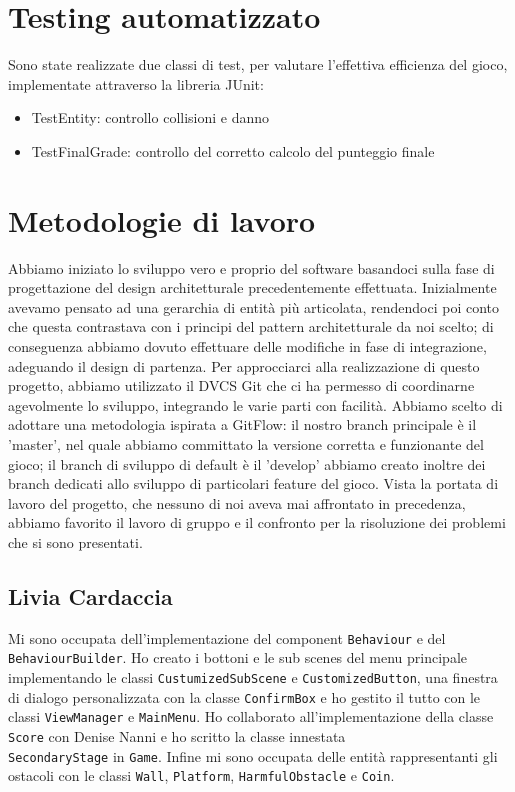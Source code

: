 \documentclass[a4paper,12pt]{report}
\begin{document}
\section{Testing automatizzato}
Sono state realizzate due classi di test, per valutare l'effettiva efficienza del gioco, implementate attraverso la libreria JUnit:
\begin{itemize}
\item TestEntity: controllo collisioni e danno
\item TestFinalGrade: controllo del corretto calcolo del punteggio finale
\end{itemize}
\section{Metodologie di lavoro}
Abbiamo iniziato lo sviluppo vero e proprio del software basandoci sulla fase di progettazione del design architetturale precedentemente effettuata. Inizialmente avevamo pensato ad una gerarchia di entità più articolata, rendendoci poi conto che questa contrastava con i principi del pattern architetturale da noi scelto; di conseguenza abbiamo dovuto effettuare delle modifiche in fase di integrazione, adeguando il design di partenza.
Per approcciarci alla realizzazione di questo progetto, abbiamo utilizzato il DVCS Git che ci ha permesso di coordinarne agevolmente lo sviluppo, integrando le varie parti con facilità. Abbiamo scelto di adottare una metodologia ispirata a GitFlow: il nostro branch principale è il 'master', nel quale abbiamo committato la versione corretta e funzionante del gioco; il branch di sviluppo di default è il 'develop' abbiamo creato inoltre dei branch dedicati allo sviluppo di particolari feature del gioco.
Vista la portata di lavoro del progetto, che nessuno di noi aveva mai affrontato in precedenza, abbiamo favorito il lavoro di gruppo e il confronto per la risoluzione dei problemi che si sono presentati.
\subsection{Livia Cardaccia}
Mi sono occupata dell'implementazione del component \texttt{Behaviour} e del \texttt{BehaviourBuilder}.
Ho creato i bottoni e le sub scenes del menu principale implementando le classi \texttt{CustumizedSubScene} e \texttt{CustomizedButton}, una finestra di dialogo personalizzata con la classe \texttt{ConfirmBox} e ho gestito il tutto con le classi \texttt{ViewManager} e \texttt{MainMenu}. Ho collaborato all'implementazione della classe \texttt{Score} con Denise Nanni e ho scritto la classe innestata\\ \texttt{SecondaryStage} in \texttt{Game}. Infine mi sono occupata delle entità rappresentanti gli ostacoli con le classi \texttt{Wall}, \texttt{Platform}, \texttt{HarmfulObstacle} e \texttt{Coin}.
\end{document}
